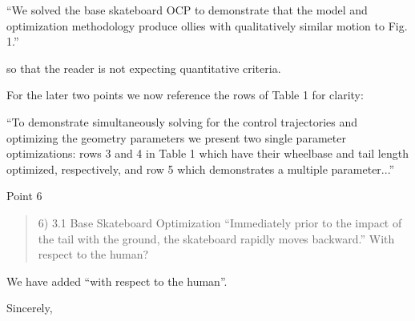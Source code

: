 \documentclass{letter}
\begin{document}
\begin{letter}{}
``We solved the base skateboard OCP to demonstrate that the model and optimization methodology produce ollies with qualitatively similar motion to Fig. 1.''

so that the reader is not expecting quantitative criteria.

For the later two points we now reference the rows of Table 1 for clarity:

``To demonstrate simultaneously solving for the control trajectories and optimizing the geometry parameters we present two single parameter optimizations: rows 3 and 4 in Table 1 which have their wheelbase and tail length optimized, respectively, and row 5 which demonstrates a multiple parameter...''

Point 6

\begin{quote}
    6) 3.1 Base Skateboard Optimization ``Immediately prior to the impact of the tail with the ground, the skateboard rapidly moves backward.'' With respect to the human?
\end{quote}

We have added ``with respect to the human''.

\closing{Sincerely,}
\end{letter}
\end{document}
